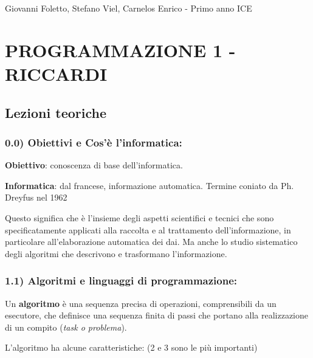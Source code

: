 \documentclass[
  paper=a4,
  oneside  ,captions=tableheading
]{scrbook}
\begin{document}



Giovanni Foletto, Stefano Viel, Carnelos Enrico - Primo anno ICE

\hypertarget{programmazione-1---riccardi}{%
\section{PROGRAMMAZIONE 1 -
RICCARDI}\label{programmazione-1---riccardi}}

\hypertarget{lezioni-teoriche}{%
\subsection{Lezioni teoriche}\label{lezioni-teoriche}}

\hypertarget{obiettivi-e-cosuxe8-linformatica}{%
\subsubsection{0.0) Obiettivi e Cos'è
l'informatica:}\label{obiettivi-e-cosuxe8-linformatica}}

\hspace{0pt} \textbf{Obiettivo}: conoscenza di base dell'informatica.

\hspace{0pt} \textbf{Informatica}: dal francese, informazione
automatica. Termine coniato da Ph. Dreyfus nel 1962

\hspace{0pt} Questo significa che è l'insieme degli aspetti scientifici
e tecnici che sono specificatamente applicati alla raccolta e al
trattamento dell'informazione, in particolare all'elaborazione
automatica dei dai. Ma anche lo studio sistematico degli algoritmi che
descrivono e trasformano l'informazione.

\hypertarget{algoritmi-e-linguaggi-di-programmazione}{%
\subsubsection{1.1) Algoritmi e linguaggi di
programmazione:}\label{algoritmi-e-linguaggi-di-programmazione}}

Un \textbf{algoritmo} è una sequenza precisa di operazioni,
comprensibili da un esecutore, che definisce una sequenza finita di
passi che portano alla realizzazione di un compito (\emph{task o
problema}).

L'algoritmo ha alcune caratteristiche: (2 e 3 sono le più importanti)
\end{document}
